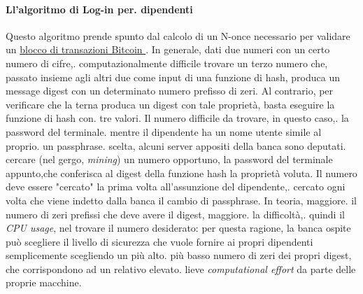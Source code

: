 			\paragraph{Ll'algoritmo di Log-in per. dipendenti}
			Questo algoritmo prende spunto dal calcolo di un N-once necessario per validare un \href{https://en.bitcoin.it/wiki/Block}{blocco di transazioni Bitcoin }.
			In generale, dati due numeri con un certo numero di cifre,. computazionalmente difficile trovare un terzo numero che, passato insieme agli altri due come input di una funzione di hash, produca un message digest con un determinato numero prefisso di zeri.
			Al contrario, per verificare che la terna produca un digest con tale proprietà, basta eseguire la funzione di hash con. tre valori.
			Il numero difficile da trovare, in questo caso,. la password del terminale. mentre il dipendente ha un nome utente simile al proprio. un passphrase. scelta, alcuni server appositi della banca sono deputati. cercare (nel gergo, \emph{mining}) un numero opportuno, la password del terminale appunto,che conferisca al digest della funzione hash la proprietà voluta.
Il numero deve essere "cercato" la prima volta all'assunzione del dipendente,. cercato ogni volta che viene indetto dalla banca il cambio di passphrase.
			 In teoria, maggiore. il numero di zeri prefissi che deve avere il digest, maggiore. la difficoltà,. quindi il \emph{CPU usage}, nel trovare il numero desiderato: per questa ragione, la banca ospite può scegliere il livello di sicurezza  che vuole fornire ai propri dipendenti semplicemente scegliendo un più alto. più basso numero di zeri dei propri digest, che corrispondono ad un relativo elevato. lieve \emph{computational effort} da parte delle proprie macchine.







